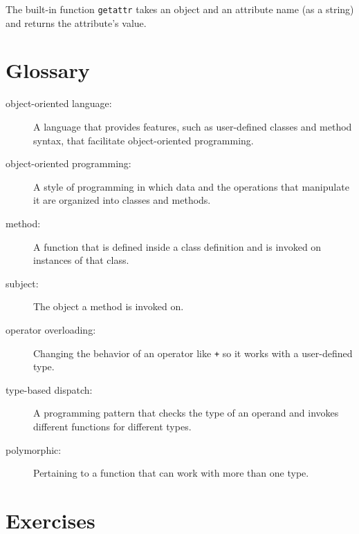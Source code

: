 
The built-in function {\tt getattr} takes an object and an attribute
name (as a string) and returns the attribute's value.



\section{Glossary}

\begin{description}

\item[object-oriented language:] A language that provides features,
  such as user-defined classes and method syntax, that facilitate
  object-oriented programming.

\item[object-oriented programming:] A style of programming in which
data and the operations that manipulate it are organized into classes
and methods.

\item[method:] A function that is defined inside a class definition and
is invoked on instances of that class.

\item[subject:] The object a method is invoked on.

\item[operator overloading:] Changing the behavior of an operator like
{\tt +} so it works with a user-defined type.

\item[type-based dispatch:] A programming pattern that checks the type
of an operand and invokes different functions for different types.

\item[polymorphic:] Pertaining to a function that can work with more
  than one type.  


\end{description}

\section{Exercises}


